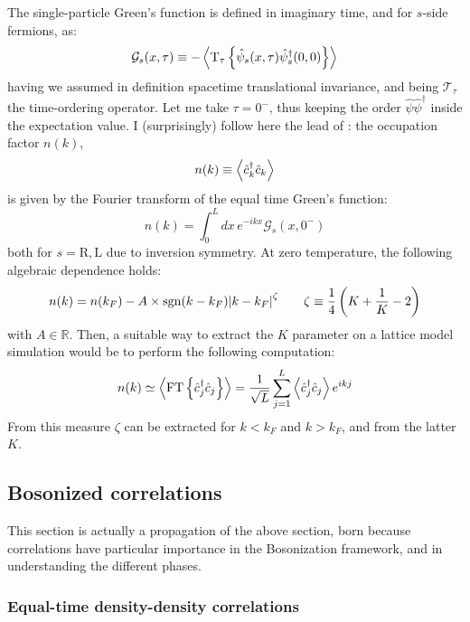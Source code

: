 The single-particle Green's function is defined in imaginary time, and for $s$-side fermions, as:
\[
	\mathcal{G}_s (x,\tau) \equiv - \ev{\mathrm{T}_\tau \left\{ \hat \psi_s (x,\tau) \hat \psi_s ^\dagger (0,0) \right\}}
\]
having we assumed in definition spacetime translational invariance, and being $\mathcal{T}_\tau$ the time-ordering operator. Let me take $\tau = 0^-$, thus keeping the order $\hat \psi \hat \psi^\dagger$ inside the expectation value. I (surprisingly) follow here the lead of \cite{giamarchi2003quantum, senechal1999introduction}: the occupation factor $n(k)$,
\[
	n(k) \equiv \ev{\hat c_k^\dagger \hat c_k}
\]
is given by the Fourier transform of the equal time Green's function:
\[
	n(k) = \int_0^L dx \, e^{-ikx} \mathcal{G}_s (x,0^-)
\]
both for $s=\mathrm{R}, \mathrm{L}$ due to inversion symmetry. At zero temperature, the following algebraic dependence holds:
\[
	n(k) = n(k_F) - A \times \mathrm{sgn}(k-k_F) \abs{k-k_F}^\zeta
	\qquad
	\zeta \equiv \frac{1}{4} \left( K + \frac{1}{K} - 2 \right)
\]
with $A \in \mathbb{R}$. Then, a suitable way to extract the $K$ parameter on a lattice model simulation would be to perform the following computation:
\[
	n(k) \simeq \ev{ \mathrm{FT} \left\{ \hat c_j^\dagger \hat c_j \right\} } = \frac{1}{\sqrt{L}} \sum_{j=1}^L \ev{ \hat c_j^\dagger \hat c_j } e^{i k j}
\]
From this measure $\zeta$ can be extracted for $k<k_F$ and $k>k_F$, and from the latter $K$.

\subsection{Bosonized correlations}

This section is actually a propagation of the above section, born because correlations have particular importance in the Bosonization framework, and in understanding the different phases.

\subsubsection{Equal-time density-density correlations}

